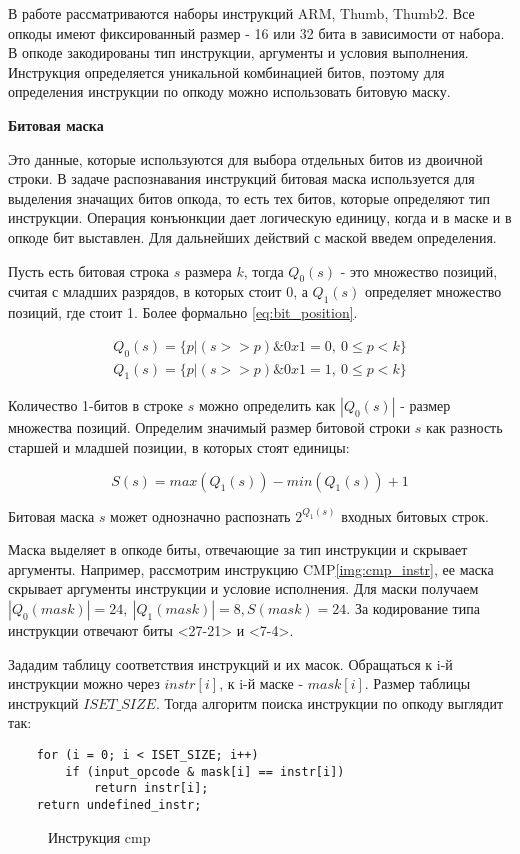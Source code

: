 
В работе рассматриваются наборы инструкций ARM, Thumb, Thumb2. Все опкоды имеют фиксированный размер - 16 или 32 бита в зависимости от набора. В опкоде закодированы тип инструкции, аргументы и условия выполнения. Инструкция определяется уникальной комбинацией битов, поэтому для определения инструкции по опкоду можно использовать битовую маску.


\textbf{Битовая маска}

Это данные, которые используются для выбора отдельных битов из двоичной строки. В задаче распознавания инструкций битовая маска используется для выделения значащих битов опкода, то есть тех битов, которые определяют тип инструкции. Операция конъюнкции дает логическую единицу, когда и в маске и в опкоде бит выставлен. Для дальнейших действий с маской введем определения.

Пусть есть битовая строка $s$ размера $k$, тогда $Q_0(s)$ - это множество позиций, считая с младших разрядов, в которых стоит 0, а $Q_1(s)$ определяет множество позиций, где стоит 1. Более формально \ref{eq:bit_position}.

\begin{eqnarray} \label{eq:bit_position}
	Q_0(s) = \{p | (s >> p) \& 0x1 = 0,\ 0 \le p < k\} \nonumber \\ 
	Q_1(s) = \{p | (s >> p) \& 0x1 = 1,\ 0 \le p < k\}
\end{eqnarray}

Количество 1-битов в строке $s$ можно определить как $|Q_0(s)|$ - размер множества позиций. Определим значимый размер битовой строки $s$ как разность старшей и младшей позиции, в которых стоят единицы:

\begin{equation}
	S(s) = max(Q_1(s)) - min(Q_1(s)) + 1
\end{equation}

Битовая маска $s$ может однозначно распознать $2^{Q_1(s)}$ входных битовых строк. 

Маска выделяет в опкоде биты, отвечающие за тип инструкции и скрывает аргументы. Например, рассмотрим инструкцию CMP\ref{img:cmp_instr}, ее маска скрывает аргументы инструкции и условие исполнения. Для маски получаем $|Q_0(mask)| = 24,\ |Q_1(mask)| = 8, S(mask) = 24$. За кодирование типа инструкции отвечают биты <27-21> и <7-4>.


Зададим таблицу соответствия инструкций и их масок. Обращаться к i-й инструкции можно через $instr[i]$, к i-й маске - $mask[i]$. Размер таблицы инструкций $ISET\_SIZE$. Тогда алгоритм поиска инструкции по опкоду выглядит так:

\begin{verbatim}
    for (i = 0; i < ISET_SIZE; i++)
        if (input_opcode & mask[i] == instr[i])
            return instr[i];
    return undefined_instr;
\end{verbatim}


\begin{figure}[h!] \label{img:cmp_instr}
    \caption{Инструкция cmp }
    \label{img:fmt_cmp}
\end{figure}
